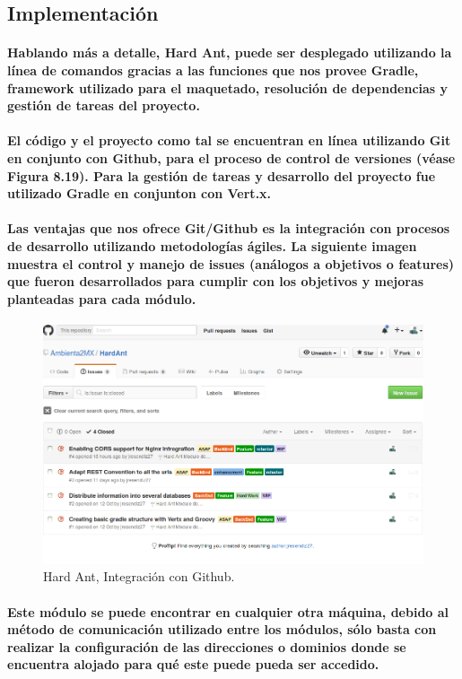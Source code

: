   \subsection{Implementación}
    \paragraph{Hablando más a detalle, Hard Ant, puede ser desplegado utilizando la línea de comandos gracias a las funciones que nos provee Gradle, framework utilizado para el maquetado, resolución de dependencias y gestión de tareas del proyecto. \cite{34}}
    \paragraph{El código y el proyecto como tal se encuentran en línea utilizando Git\cite{38} en conjunto con Github\cite{39}, para el proceso de control de versiones (véase Figura 8.19). Para la gestión de tareas y desarrollo del proyecto fue utilizado Gradle en conjunton con Vert.x.}
    \paragraph{Las ventajas que nos ofrece Git/Github es la integración con procesos de desarrollo utilizando metodologías ágiles. La siguiente imagen muestra el control y manejo de issues (análogos a objetivos o features) que fueron desarrollados para cumplir con los objetivos y mejoras planteadas para cada módulo.}
    \begin{figure}[h!]
        \centering
          \includegraphics[width=\textwidth]{./images/HardAntIssues.png}
          \caption{Hard Ant, Integración con Github.}
    \end{figure}
    \paragraph{Este módulo se puede encontrar en cualquier otra máquina, debido al método de comunicación utilizado entre los módulos, sólo basta con realizar la configuración de las direcciones o dominios donde se encuentra alojado para qué este puede pueda ser accedido.}
